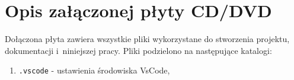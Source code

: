 \chapter{Opis załączonej płyty CD/DVD}
Dołączona płyta zawiera wszystkie pliki wykorzystane do stworzenia projektu, dokumentacji i~niniejszej pracy. Pliki podzielono na następujące katalogi:

\begin{enumerate}
    \item \texttt{.vscode} - ustawienia środowiska VsCode,
\end{enumerate}